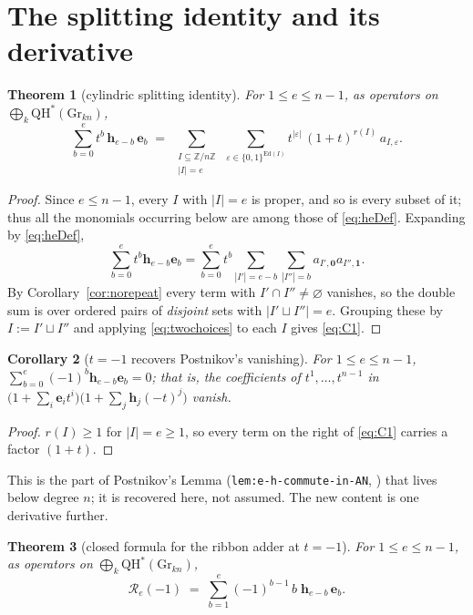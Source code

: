 \documentclass[11pt]{article}
\theoremstyle{plain}
\newtheorem{theorem}{Theorem}
\newtheorem{corollary}[theorem]{Corollary}
\theoremstyle{definition}
\newcommand{\QH}{\mathrm{QH}^*}
\newcommand{\Gr}{\mathrm{Gr}}
\newcommand{\ZZ}{\mathbb{Z}}
\newcommand{\bh}{\mathbf h}
\newcommand{\be}{\mathbf e}
\begin{document}
\section{The splitting identity and its derivative}

\begin{theorem}[cylindric splitting identity]\label{thm:C1}
For $1\le e\le n-1$, as operators on $\bigoplus_k\QH(\Gr_{kn})$,
\begin{equation}\label{eq:C1}
\sum_{b=0}^{e}t^{b}\,\bh_{e-b}\,\be_{b}
\;=\;
\sum_{\substack{I\subseteq\ZZ/n\ZZ\\ |I|=e}}\ \sum_{\varepsilon\in\{0,1\}^{\mathrm{Ed}(I)}}
t^{|\varepsilon|}\,(1+t)^{r(I)}\,a_{I,\varepsilon}.
\end{equation}
\end{theorem}

\begin{proof}
Since $e\le n-1$, every $I$ with $|I|=e$ is proper, and so is every subset of
it; thus all the monomials occurring below are among those of
\eqref{eq:heDef}.  Expanding by \eqref{eq:heDef},
\[
\sum_{b=0}^{e}t^{b}\bh_{e-b}\be_{b}
=\sum_{b=0}^{e}t^{b}\sum_{|I'|=e-b}\sum_{|I''|=b}a_{I',\mathbf 0}a_{I'',\mathbf 1}.
\]
By Corollary~\ref{cor:norepeat} every term with $I'\cap I''\ne\varnothing$
vanishes, so the double sum is over ordered pairs of \emph{disjoint} sets with
$|I'\sqcup I''|=e$.  Grouping these by $I:=I'\sqcup I''$ and applying
\eqref{eq:twochoices} to each $I$ gives \eqref{eq:C1}.
\end{proof}

\begin{corollary}[$t=-1$ recovers Postnikov's vanishing]\label{cor:posvanish}
For $1\le e\le n-1$, $\sum_{b=0}^{e}(-1)^b\bh_{e-b}\be_b=0$; that is, the
coefficients of $t^1,\dots,t^{n-1}$ in $\bigl(1+\sum_i\be_it^i\bigr)
\bigl(1+\sum_j\bh_j(-t)^j\bigr)$ vanish.
\end{corollary}

\begin{proof}
$r(I)\ge1$ for $|I|=e\ge1$, so every term on the right of \eqref{eq:C1} carries
a factor $(1+t)$.
\end{proof}

This is the part of Postnikov's Lemma (\texttt{lem:e-h-commute-in-AN},
\cite[ll.2882--2893]{Pos}) that lives below degree $n$; it is recovered here,
not assumed.  The new content is one derivative further.

\begin{theorem}[closed formula for the ribbon adder at $t=-1$]\label{thm:pe}
For $1\le e\le n-1$, as operators on $\bigoplus_k\QH(\Gr_{kn})$,
\begin{equation}\label{eq:pe}
\boxed{\;\mathcal R_e(-1)\;=\;\sum_{b=1}^{e}(-1)^{b-1}\,b\;\bh_{e-b}\,\be_{b}.\;}
\end{equation}
\end{theorem}
\end{document}
